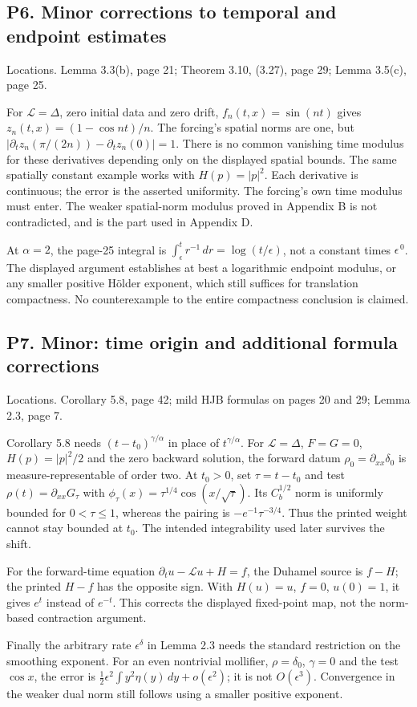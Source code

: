 \documentclass[10pt]{article}
\begin{document}
\subsection*{P6. Minor corrections to temporal and endpoint estimates}
Locations. Lemma 3.3(b), page 21; Theorem 3.10, (3.27), page 29; Lemma 3.5(c), page 25.\par
For \(\mathcal L=\Delta\), zero initial data and zero drift, \(f_n(t,x)=\sin(nt)\) gives \(z_n(t,x)=(1-\cos nt)/n\). The forcing’s spatial norms are one, but \(|\partial_tz_n(\pi/(2n))-\partial_tz_n(0)|=1\). There is no common vanishing time modulus for these derivatives depending only on the displayed spatial bounds. The same spatially constant example works with \(H(p)=|p|^2\). Each derivative is continuous; the error is the asserted uniformity. The forcing’s own time modulus must enter. The weaker spatial-norm modulus proved in Appendix B is not contradicted, and is the part used in Appendix D.\par
At \(\alpha=2\), the page-25 integral is \(\int_\epsilon^t r^{-1}\,dr=\log(t/\epsilon)\), not a constant times \(\epsilon^{\,0}\). The displayed argument establishes at best a logarithmic endpoint modulus, or any smaller positive Hölder exponent, which still suffices for translation compactness. No counterexample to the entire compactness conclusion is claimed.\par
\subsection*{P7. Minor: time origin and additional formula corrections}
Locations. Corollary 5.8, page 42; mild HJB formulas on pages 20 and 29; Lemma 2.3, page 7.\par
Corollary 5.8 needs \((t-t_0)^{\gamma/\alpha}\) in place of \(t^{\gamma/\alpha}\). For \(\mathcal L=\Delta\), \(F=G=0\), \(H(p)=|p|^2/2\) and the zero backward solution, the forward datum \(\rho_0=\partial_{xx}\delta_0\) is measure-representable of order two. At \(t_0>0\), set \(\tau=t-t_0\) and test \(\rho(t)=\partial_{xx}G_\tau\) with \(\phi_\tau(x)=\tau^{1/4}\cos(x/\sqrt\tau)\). Its \(C_b^{1/2}\) norm is uniformly bounded for \(0<\tau\le1\), whereas the pairing is \(-e^{-1}\tau^{-3/4}\). Thus the printed weight cannot stay bounded at \(t_0\). The intended integrability used later survives the shift.\par
For the forward-time equation \(\partial_tu-\mathcal Lu+H=f\), the Duhamel source is \(f-H\); the printed \(H-f\) has the opposite sign. With \(H(u)=u\), \(f=0\), \(u(0)=1\), it gives \(e^t\) instead of \(e^{-t}\). This corrects the displayed fixed-point map, not the norm-based contraction argument.\par
Finally the arbitrary rate \(\epsilon^\delta\) in Lemma 2.3 needs the standard restriction on the smoothing exponent. For an even nontrivial mollifier, \(\rho=\delta_0\), \(\gamma=0\) and the test \(\cos x\), the error is \(\frac12\epsilon^2\int y^2\eta(y)\,dy+o(\epsilon^2)\); it is not \(O(\epsilon^3)\). Convergence in the weaker dual norm still follows using a smaller positive exponent.\par
\end{document}
